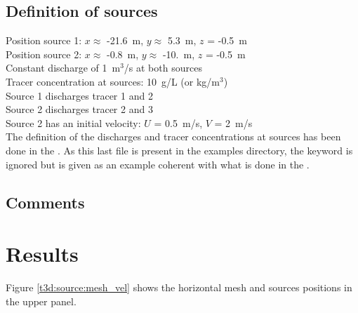 \subsection{Definition of sources}
%
Position source 1: $x \approx$ -21.6~m, $y \approx$ 5.3~m, $z$ = -0.5~m\\
Position source 2: $x \approx$ -0.8~m, $y \approx$ -10.~m, $z$ = -0.5~m\\
Constant discharge of 1~m$^3$/s at both sources\\
Tracer concentration at sources: 10~g/L (or kg/m$^3$)\\
Source 1 discharges tracer 1 and 2\\
Source 2 discharges tracer 2 and 3\\
Source 2 has an initial velocity: $U$ = 0.5~m/s, $V$ = 2~m/s\\
%
The definition of the discharges and tracer concentrations at sources
has been done in the .
As this last file is present in the examples directory, the keyword
 is ignored but is given
as an example coherent with what is done in the .
%
\subsection{Comments}
%
%
%
\section{Results}
%
Figure \ref{t3d:source:mesh_vel} shows the horizontal mesh and sources
positions in the upper panel.

